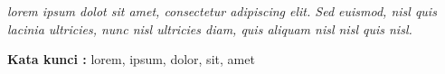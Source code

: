 \begin{abstracteng}
\textit{lorem ipsum dolot sit amet, consectetur adipiscing elit. Sed euismod, nisl quis lacinia ultricies, nunc nisl ultricies diam, quis aliquam nisl nisl quis nisl.}

\bigskip
\noindent
\textbf{Kata kunci :} lorem, ipsum, dolor, sit, amet
\end{abstracteng}